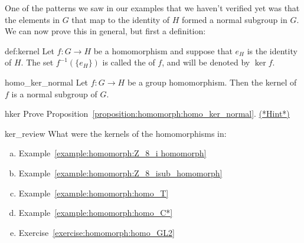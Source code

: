 \medskip

One of the patterns we saw in our examples that we haven't verified yet was that the elements in $G$ that map to the identity of $H$ formed a normal subgroup in $G$.  We can now prove this in general, but first a definition:
 
\begin{defn}{def:kernel} 
Let $f : G \rightarrow H$ be a  homomorphism and suppose that
$e_H$ is the identity of $H$. 
The set  $f^{-1} ( \{ e_H \})$ is  called the  of $f$, and will
be denoted by $\ker f$\label{kernelofphi}. 
\end{defn}
 
 
\begin{prop}{homo_ker_normal}
Let $f : G \rightarrow H$ be a group homomorphism. Then the kernel
of $f$ is a normal subgroup of $G$. 
\end{prop}

\begin{exercise}{hker}
Prove Proposition~\ref{proposition:homomorph:homo_ker_normal}. 
\hyperref[sec:homomorph:hints]{(*Hint*)} 
\end{exercise}

\begin{exercise}{ker_review}
What were the kernels of the homomorphisms in:
\begin{enumerate}[(a)]
\item
Example~\ref{example:homomorph:Z_8_i homomorph}
\item
Example~\ref{example:homomorph:Z_8_isub_homomorph}
\item
Example~\ref{example:homomorph:homo_T}
\item
Example~\ref{example:homomorph:homo_C*}
\item
Exercise~\ref{exercise:homomorph:homo_GL2}
\end{enumerate}
\end{exercise} 
 
 
